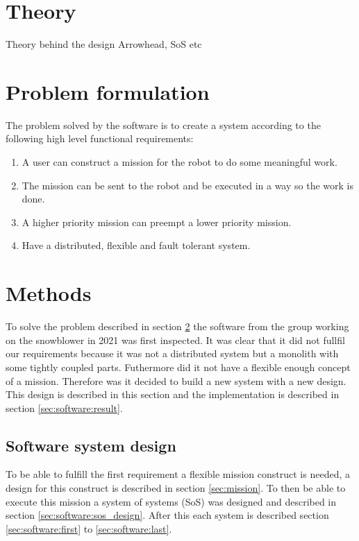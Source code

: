 \documentclass{article}
\title{}
\author{}
\date{\today}
\begin{document}
\section{Theory}
Theory behind the design Arrowhead, SoS etc

\section{Problem formulation}
\label{sec:software:problem_formulation}

The problem solved by the software is to create a system according to the following high level functional requirements:\\
\begin{enumerate}
    \item A user can construct a mission for the robot to do some meaningful work.
    \item The mission can be sent to the robot and be executed in a way so the work is done.
    \item A higher priority mission can preempt a lower priority mission.
    \item Have a distributed, flexible and fault tolerant system.
\end{enumerate}

\section{Methods}


To solve the problem described in section \ref{sec:software:problem_formulation} the software from the group working on the snowblower in 2021 was first inspected. It was clear that it did not fullfil our requirements because it was not a distributed system but a monolith with some tightly coupled parts. Futhermore did it not have a flexible enough concept of a mission. Therefore was it decided to build a new system with a new design. This design is described in this section and the implementation is described in section \ref{sec:software:result}.

\subsection{Software system design}
\label{sec:software:design}

To be able to fulfill the first requirement a flexible mission construct is needed, a design for this construct is described in section \ref{sec:mission}. To then be able to execute this mission a system of systems (SoS) was designed and described in section \ref{sec:software:sos_design}. After this each system is described section \ref{sec:software:first} to \ref{sec:software:last}.
\end{document}
